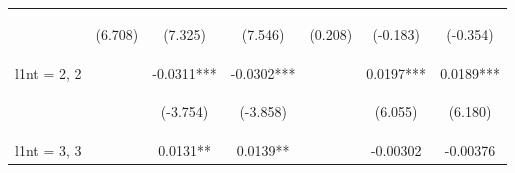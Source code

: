 \documentclass[]{article}
\begin{document}
\begin{center}
\begin{tabular}{lcccccc}
        \vspace{4pt}     & \begin{footnotesize}(6.708)\end{footnotesize}  & \begin{footnotesize}(7.325)\end{footnotesize}  & \begin{footnotesize}(7.546)\end{footnotesize}  & \begin{footnotesize}(0.208)\end{footnotesize}  & \begin{footnotesize}(-0.183)\end{footnotesize} & \begin{footnotesize}(-0.354)\end{footnotesize} \\
        l1nt = 2, 2      &                                                & -0.0311***                                     & -0.0302***                                     &                                                & 0.0197***                                      & 0.0189***                                      \\
        \vspace{4pt}     & \begin{footnotesize}\end{footnotesize}         & \begin{footnotesize}(-3.754)\end{footnotesize} & \begin{footnotesize}(-3.858)\end{footnotesize} & \begin{footnotesize}\end{footnotesize}         & \begin{footnotesize}(6.055)\end{footnotesize}  & \begin{footnotesize}(6.180)\end{footnotesize}  \\
        l1nt = 3, 3      &                                                & 0.0131**                                       & 0.0139**                                       &                                                & -0.00302                                       & -0.00376                                       \\

\end{tabular}
\end{center}
\end{document}
